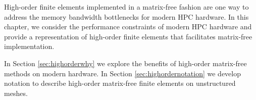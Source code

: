 High-order finite elements implemented in a matrix-free fashion are one way to address the memory bandwidth bottlenecks for modern HPC hardware.
In this chapter, we consider the performance constraints of modern HPC hardware and provide a representation of high-order finite elements that facilitates matrix-free implementation.

In Section \ref{sec:highorderwhy} we explore the benefits of high-order matrix-free methods on modern hardware.
In Section \ref{sec:highordernotation} we develop notation to describe high-order matrix-free finite elements on unstructured meshes.
